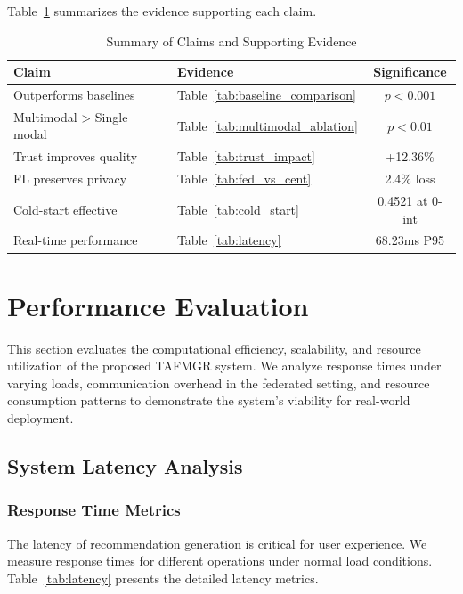Table~\ref{tab:claims} summarizes the evidence supporting each claim.

\begin{table}[h]
\centering
\caption{Summary of Claims and Supporting Evidence}
\label{tab:claims}
\begin{tabular}{llc}
\toprule
\textbf{Claim} & \textbf{Evidence} & \textbf{Significance} \\
\midrule
Outperforms baselines & Table~\ref{tab:baseline_comparison} & $p < 0.001$ \\
Multimodal > Single modal & Table~\ref{tab:multimodal_ablation} & $p < 0.01$ \\
Trust improves quality & Table~\ref{tab:trust_impact} & +12.36\% \\
FL preserves privacy & Table~\ref{tab:fed_vs_cent} & 2.4\% loss \\
Cold-start effective & Table~\ref{tab:cold_start} & 0.4521 at 0-int \\
Real-time performance & Table~\ref{tab:latency} & 68.23ms P95 \\
\bottomrule
\end{tabular}
\end{table}


\section{Performance Evaluation}
\label{sec:performance}

This section evaluates the computational efficiency, scalability, and resource utilization of the proposed TAFMGR system. We analyze response times under varying loads, communication overhead in the federated setting, and resource consumption patterns to demonstrate the system's viability for real-world deployment.

\subsection{System Latency Analysis}
\label{subsec:latency}

\subsubsection{Response Time Metrics}

The latency of recommendation generation is critical for user experience. We measure response times for different operations under normal load conditions. Table~\ref{tab:latency} presents the detailed latency metrics.


